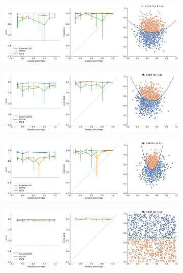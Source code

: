 \begin{appendices}
\begin{figure}
    \begin{subfigure}{.5\textwidth}
        \centering
        \includegraphics[width=\textwidth]{img/comp_old/1.pdf}
    \end{subfigure}%
    \begin{subfigure}{.5\textwidth}
        \centering
        \includegraphics[width=\textwidth]{img/comp_old/2.pdf}
    \end{subfigure}
    \hfill
    \begin{subfigure}{.5\textwidth}
        \centering
        \includegraphics[width=\textwidth]{img/comp_old/5.pdf}
    \end{subfigure}
    \begin{subfigure}{.5\textwidth}
        \centering
        \includegraphics[width=\textwidth]{img/comp_old/6.pdf}

\end{subfigure}
\end{figure}
\end{appendices}
